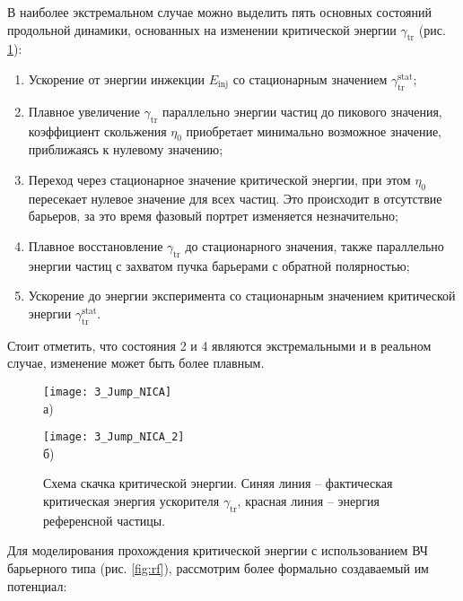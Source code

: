 В наиболее экстремальном случае можно выделить пять основных состояний продольной динамики, основанных на изменении критической энергии
$\gamma_{\textrm{tr}}$ (рис. \ref{fig:jump_NICA}):

\begin{enumerate} 
  \item Ускорение от энергии инжекции $E_{\textrm{inj}}$ со стационарным значением $\gamma_{\textrm{tr}}^{\textrm{stat}}$;
  \item  Плавное увеличение $\gamma_{\textrm{tr}}$ параллельно энергии частиц до пикового значения, коэффициент скольжения $\eta_0$ приобретает минимально возможное значение, приближаясь к нулевому значению;
  \item Переход через стационарное значение критической энергии, при этом $\eta_0$ пересекает нулевое значение для всех частиц. Это происходит в отсутствие барьеров, за это время фазовый портрет изменяется незначительно;
  \item Плавное восстановление $\gamma_{\textrm{tr}}$ до стационарного значения, также па\-рал\-лель\-но энергии частиц с захватом пучка барьерами с обратной полярностью;
  \item Ускорение до энергии эксперимента со стационарным значением критической энергии $\gamma_{\textrm{tr}}^{\textrm{stat}}$.
\end{enumerate}

\noindent Стоит отметить, что состояния 2 и 4 являются экстремальными и в реальном случае, изменение может быть более плавным.

\begin{figure}[!h]
    \begin{minipage}[b][][b]{0.49\linewidth}\centering
        \texttt{[image: 3\_Jump\_NICA]} \\ а)
    \end{minipage}
    \hfill
    \begin{minipage}[b][][b]{0.49\linewidth}\centering
        \texttt{[image: 3\_Jump\_NICA\_2]} \\ б)
    \end{minipage}
    \caption{Схема скачка критической энергии. Синяя линия – фактическая критическая энергия ускорителя $\gamma_{\textrm{tr}}$, красная линия – энергия референсной частицы.}
    \label{fig:jump_NICA}
\end{figure}

\par Для моделирования прохождения критической энергии с использованием ВЧ барьерного типа (рис. \ref{fig:rf}), рассмотрим более формально создаваемый им потенциал:


